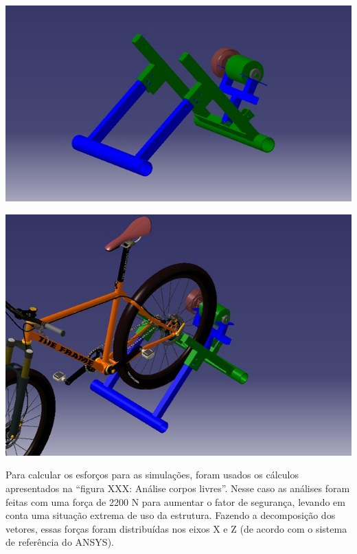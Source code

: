     \begin{center}
    	\includegraphics[scale=0.7]{figuras/parte_traseira_2}
        \label{parte_traseira_2}
    \end{center}        
   
    \begin{center}
    	\includegraphics[scale=0.7]{figuras/acoplamento_est_1}
        \label{acoplamento_est_1}
    \end{center}      
  
    Para calcular os esforços para as simulações, foram usados os cálculos apresentados na “figura XXX: Análise corpos livres”.  Nesse caso as análises foram feitas com uma força de 2200 N para aumentar o fator de segurança, levando em conta uma situação extrema de uso da estrutura. Fazendo a decomposição dos vetores, essas forças foram distribuídas nos eixos X e Z (de acordo com o sistema de referência do ANSYS).

